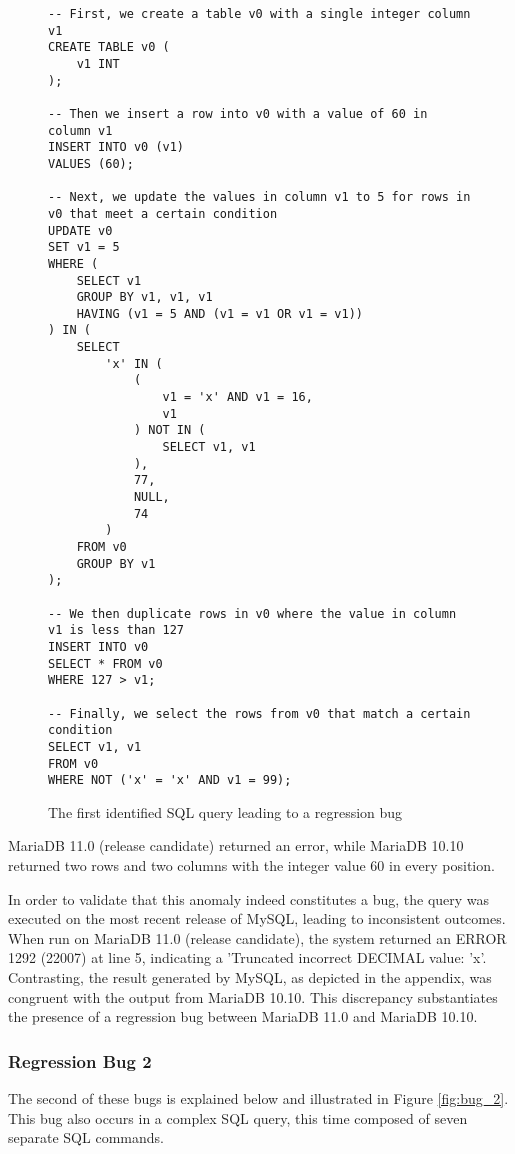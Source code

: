 \documentclass[sigconf]{acmart}
\begin{document}
\begin{figure}
\centering
\begin{lstlisting}
-- First, we create a table v0 with a single integer column v1
CREATE TABLE v0 (
    v1 INT
);

-- Then we insert a row into v0 with a value of 60 in column v1
INSERT INTO v0 (v1) 
VALUES (60);

-- Next, we update the values in column v1 to 5 for rows in v0 that meet a certain condition
UPDATE v0 
SET v1 = 5 
WHERE (
    SELECT v1 
    GROUP BY v1, v1, v1 
    HAVING (v1 = 5 AND (v1 = v1 OR v1 = v1))
) IN (
    SELECT 
        'x' IN (
            (
                v1 = 'x' AND v1 = 16, 
                v1
            ) NOT IN (
                SELECT v1, v1
            ), 
            77, 
            NULL, 
            74
        ) 
    FROM v0 
    GROUP BY v1
);

-- We then duplicate rows in v0 where the value in column v1 is less than 127
INSERT INTO v0 
SELECT * FROM v0 
WHERE 127 > v1;

-- Finally, we select the rows from v0 that match a certain condition
SELECT v1, v1 
FROM v0 
WHERE NOT ('x' = 'x' AND v1 = 99);
\end{lstlisting}
\caption{The first identified SQL query leading to a regression bug}
\label{fig:bug_1}
\end{figure}


MariaDB 11.0 (release candidate) returned an error, while MariaDB 10.10 returned two rows and two columns with the integer value 60 in every position.

In order to validate that this anomaly indeed constitutes a bug, the query was executed on the most recent release of MySQL, leading to inconsistent outcomes. When run on MariaDB 11.0 (release candidate), the system returned an ERROR 1292 (22007) at line 5, indicating a 'Truncated incorrect DECIMAL value: 'x'. Contrasting, the result generated by MySQL, as depicted in the appendix, was congruent with the output from MariaDB 10.10. This discrepancy substantiates the presence of a regression bug between MariaDB 11.0 and MariaDB 10.10.

\subsubsection{Regression Bug 2}

The second of these bugs is explained below and illustrated in Figure \ref{fig:bug_2}. This bug also occurs in a complex SQL query, this time composed of seven separate SQL commands.
\end{document}
